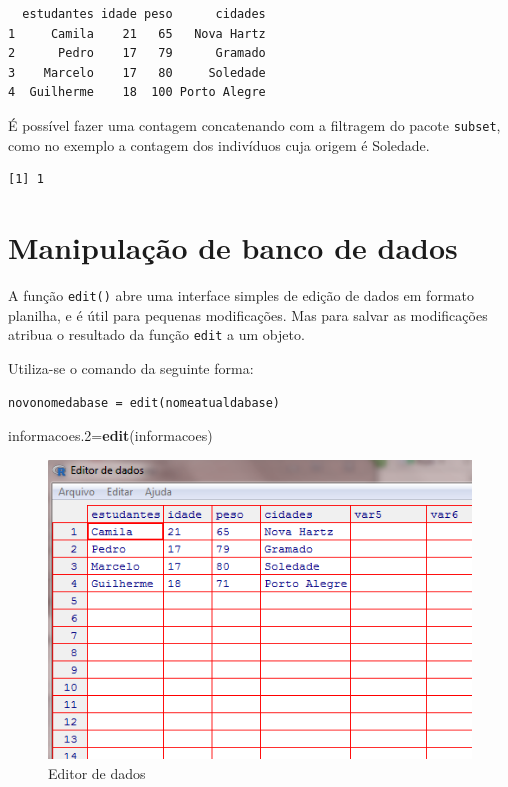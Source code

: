 \documentclass[12pt,brazil,oneside]{book}
\newenvironment{Shaded}{\begin{snugshade}}{\end{snugshade}}
\newcommand{\FloatTok}[1]{\textcolor[rgb]{0.00,0.00,0.81}{#1}}
\newcommand{\KeywordTok}[1]{\textcolor[rgb]{0.13,0.29,0.53}{\textbf{#1}}}
\newcommand{\NormalTok}[1]{#1}
\newcommand{\OperatorTok}[1]{\textcolor[rgb]{0.81,0.36,0.00}{\textbf{#1}}}
\newcommand{\StringTok}[1]{\textcolor[rgb]{0.31,0.60,0.02}{#1}}
\begin{document}
\begin{verbatim}
  estudantes idade peso      cidades
1     Camila    21   65   Nova Hartz
2      Pedro    17   79      Gramado
3    Marcelo    17   80     Soledade
4  Guilherme    18  100 Porto Alegre
\end{verbatim}

É possível fazer uma contagem concatenando com a filtragem do pacote \texttt{subset}, como no exemplo a contagem dos indivíduos cuja origem é Soledade.

\begin{Shaded}
\end{Shaded}

\begin{verbatim}
[1] 1
\end{verbatim}

\hypertarget{manipulacao-de-banco-de-dados}{%
\section{Manipulação de banco de dados}\label{manipulacao-de-banco-de-dados}}

A função \texttt{edit()} abre uma interface simples de edição de dados em formato planilha, e é útil para pequenas modificações. Mas para salvar as modificações atribua o resultado da função \texttt{edit} a um objeto.

Utiliza-se o comando da seguinte forma:

\texttt{novonomedabase\ =\ edit(nomeatualdabase)}

\begin{Shaded}
\begin{Highlighting}[]
\NormalTok{informacoes}\FloatTok{.2}\NormalTok{=}\KeywordTok{edit}\NormalTok{(informacoes)}
\end{Highlighting}
\end{Shaded}

\begin{figure}[H]

{\centering \includegraphics[width=0.8\linewidth]{95} 

}

\caption{Editor de dados}\label{fig:95}
\end{figure}
\end{document}
